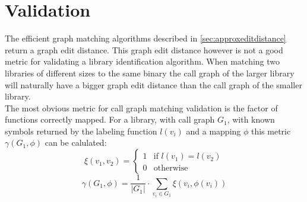 \documentclass[
    12pt,                               %
    DIV=14,                     %
    parskip=half+,              %
    bigheadings,                %
    cleardoubleempty,   %
    halfparskip,                %
    ]{scrreprt} %
\begin{document}
\chapter{Validation} \label{chap:validation}
The efficient graph matching algorithms described in \ref{sec:approxeditdistance} return a graph edit distance. This graph edit distance however is not a good metric for validating a library identification algorithm. When matching two libraries of different sizes to the same binary the call graph of the larger library will naturally have a bigger graph edit distance than the call graph of the smaller library. \\
The most obvious metric for call graph matching validation is the factor of functions correctly mapped. For a library, with call graph $G_1$, with known symbols returned by the labeling function $l(v_i)$ and a mapping $\phi$ this metric $\gamma(G_1, \phi)$ can be calulated:
\begin{equation}
\xi(v_1, v_2) = \begin{cases}
		1 & \text{if } l(v_1) = l(v_2) \\
		0 & \text{otherwise}
	\end{cases}
\end{equation}
\begin{equation}
\gamma(G_1, \phi) = \frac{1}{|G_1|} \cdot \sum_{v_i \in G_1} \xi(v_i, \phi(v_i))
\end{equation}
\end{document}
